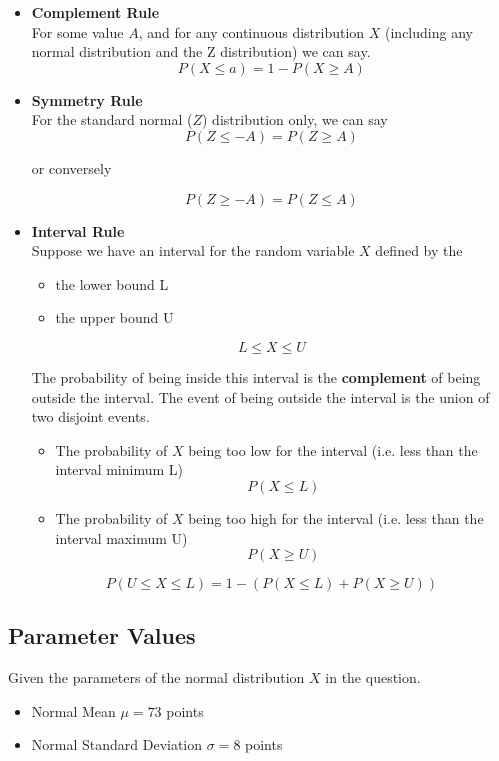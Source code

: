 \documentclass[a4paper,12pt]{article}
\begin{document}
\begin{itemize}

\item \textbf{Complement Rule}\\
For some value $A$, and for any continuous distribution $X$ (including any normal distribution and the Z distribution) we can say.
\[ P(X \leq a) = 1 - P(X \geq A) \]

\item \textbf{Symmetry Rule}\\
For the standard normal ($Z$) distribution only, we can say
 \[ P(Z \leq -A) = P(Z \geq A) \]

or conversely

\[ P(Z \geq -A) = P(Z \leq A) \]


\item \textbf{Interval Rule}\\

\noindent Suppose we have an interval for the random variable $X$ defined by the 
\begin{itemize}
\item the lower bound L
\item the upper bound U
\end{itemize}

\[ L \leq X \leq U \]

The probability of being inside this interval is the \textbf{complement} of being outside the interval.
The event of being outside the interval is the union of two disjoint events.

\begin{itemize}
\item The probability of $X$ being too low for the interval (i.e. less than the interval minimum L)
\[ P(X \leq L) \]
\item The probability of $X$ being too high for the interval (i.e. less than the interval maximum U)
\[ P(X \geq U ) \]
\end{itemize}


\[ P(U \leq X \leq L) = 1 - ( P(X \leq L) +  P(X \geq U ) ) \]
\end{itemize}

\newpage
\subsection*{Parameter Values}

Given the parameters of the normal distribution $X$ in the question.
\begin{itemize}
\item Normal Mean $\mu = 73$ points
\item Normal Standard Deviation $\sigma = 8$ points
\end{itemize}
\end{document}
